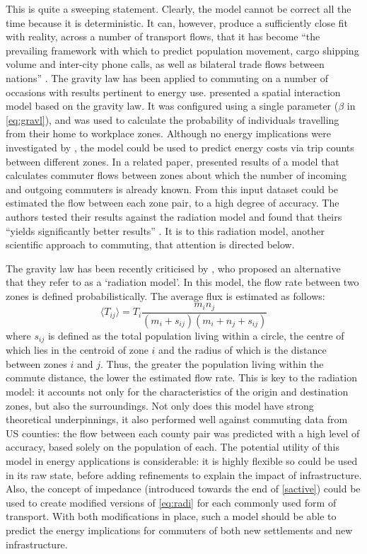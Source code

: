 This is quite a sweeping statement. Clearly, the model cannot be correct all
the time because it is deterministic. It can, however, produce a
sufficiently close fit with reality, across a number of transport flows, that it
has become ``the prevailing framework with which to predict population movement,
cargo shipping volume and inter-city phone calls, as well as bilateral trade
flows between nations'' \citep{Simini2012}. The gravity law has been applied to
commuting on a number of occasions with results pertinent to energy use.
\citet{gargiulo2012} presented a spatial interaction model based on the
gravity law. It was configured using a single parameter ($\beta$ in \cref{eq:gravl}),
and was used to calculate the probability of individuals travelling
from their home to workplace zones. Although no energy implications were investigated
by \citet{gargiulo2012}, the model could be used to
predict energy costs via trip counts between different zones.
In a related paper, \citet{Lenormandplosone2012} presented results of
a model that calculates commuter flows between zones about which the number
of incoming and outgoing commuters is already known. From this input dataset
could be estimated the flow between each zone pair, to a high degree of accuracy.
The authors tested their results against the radiation model and
found that theirs ``yields significantly better results''
\citep[p.~6]{Lenormandplosone2012}. It is to
this radiation model, another scientific approach to commuting, 
that attention is directed below.

The gravity law has been recently criticised by
\citet{Simini2012}, who proposed an alternative that they refer to as a
`radiation model'. In this model, the flow rate between two zones is defined
probabilistically. The average flux is estimated as follows:
\begin{equation}
\langle T_{ij} \rangle = T_i \frac{m_{i} n_{j}} {(m_i + s_{ij})(m_i + n_j + s_{ij}) }
\label{eq:radi}
\end{equation}
where $s_{ij}$ is defined as the total population living within a circle, the
centre of which lies in the centroid of zone $i$ and the radius of which is
the distance between zones $i$ and $j$. Thus, the greater the population
living within the commute distance, the lower the estimated flow rate.
This is key to the radiation model: it accounts not only for the characteristics
of the origin and destination zones, but also the surroundings.
Not only does this model have strong theoretical underpinnings, it also
performed well against commuting data from US counties: the flow between
each county pair was predicted with a high level of accuracy, based solely
on the population of each. The potential utility of this model in
energy applications is considerable: it is highly flexible so could be used in its
raw state, before adding refinements to explain the impact of infrastructure.
Also, the concept of impedance (introduced towards the end of \cref{sactive})
could be used to create modified versions of \cref{eq:radi}
for each commonly used form of transport. With both modifications in place,
such a model should be able to predict the energy implications for commuters of both
new settlements and new infrastructure.

